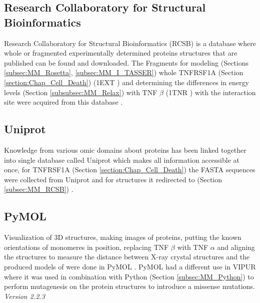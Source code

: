 \subsection{Research Collaboratory for Structural Bioinformatics}
Research Collaboratory for Structural Bioinformatics (RCSB) is a database where whole or fragmented experimentally determined proteins structures that are published can be found and downloaded. The Fragments for modeling (Sections \ref{subsec:MM_Rosetta}, \ref{subsec:MM_I_TASSER}) whole TNFRSF1A (Section \ref{section:Chap_Cell_Death}) (1EXT \cite{}) and determining the differences in energy levels (Section \ref{subsubsec:MM_Relax}) with TNF $\beta$ (1TNR \cite{}) with the interaction site were acquired from this database \cite{}.
\label{subsec:MM_RCSB}

\subsection{Uniprot}
Knowledge from various omic domains about proteins has been linked together into single database called Uniprot which makes all information accessible at once, for TNFRSF1A (Section \ref{section:Chap_Cell_Death}) the FASTA sequences were collected from Uniprot and for structures it redirected to (Section \ref{subsec:MM_RCSB}) \cite{}.
\label{subsec:MM_Uniprot}

\subsection{PyMOL}
Visualization of 3D structures, making images of proteins, putting the known orientations of monomeres in position, replacing TNF $\beta$ with TNF $\alpha$ and aligning the structures to measure the distance between X-ray crystal structures and the produced models of were done in PyMOL \cite{}. PyMOL had a different use in VIPUR where it was used in combination with Python (Section \ref{subsec:MM_Python}) to perform mutagenesis on the protein structures to introduce a missense mutations.
\label{subsec:MM_PyMOL}
\newline
\textit{Version 2.2.3}

